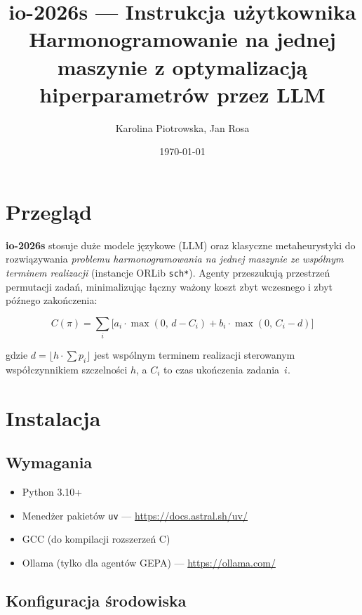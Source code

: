 \documentclass[11pt,a4paper]{article}
\title{\textbf{io-2026s --- Instrukcja użytkownika}\\[4pt]
    \large Harmonogramowanie na jednej maszynie z optymalizacją hiperparametrów przez LLM}
\author{Karolina Piotrowska, Jan Rosa}
\date{\today}
\begin{document}
\maketitle
\tableofcontents
\newpage

\section{Przegląd}

\textbf{io-2026s} stosuje duże modele językowe (LLM) oraz klasyczne metaheurystyki
do rozwiązywania \emph{problemu harmonogramowania na jednej maszynie ze wspólnym
terminem realizacji} (instancje ORLib \texttt{sch*}).
Agenty przeszukują przestrzeń permutacji zadań, minimalizując łączny ważony
koszt zbyt wczesnego i zbyt późnego zakończenia:

\[
  C(\pi) = \sum_i \bigl[ a_i \cdot \max(0,\, d - C_i) + b_i \cdot \max(0,\, C_i - d) \bigr]
\]

gdzie $d = \lfloor h \cdot \sum p_i \rfloor$ jest wspólnym terminem realizacji
sterowanym współczynnikiem szczelności $h$, a $C_i$ to czas ukończenia zadania~$i$.

\section{Instalacja}

\subsection{Wymagania}

\begin{itemize}[noitemsep]
  \item Python 3.10+
  \item Menedżer pakietów \texttt{uv} --- \url{https://docs.astral.sh/uv/}
  \item GCC (do kompilacji rozszerzeń C)
  \item Ollama (tylko dla agentów GEPA) --- \url{https://ollama.com/}
\end{itemize}

\subsection{Konfiguracja środowiska}
\end{document}
